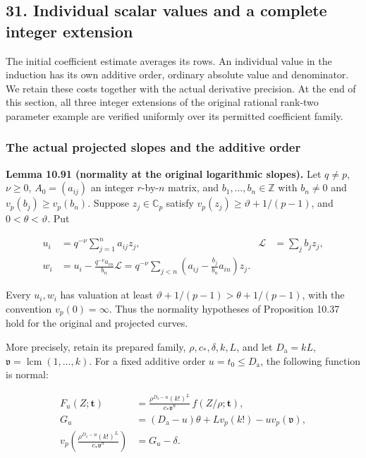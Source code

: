 \documentclass[
  11pt,
  a4paper,
]{article}
\begin{document}
\subsection{31. Individual scalar values and a complete integer
extension}\label{individual-scalar-values-and-a-complete-integer-extension}

The initial coefficient estimate averages its rows. An individual value
in the induction has its own additive order, ordinary absolute value and
denominator. We retain these costs together with the actual derivative
precision. At the end of this section, all three integer extensions of
the original rational rank-two parameter example are verified uniformly
over its permitted coefficient family.

\subsubsection{The actual projected slopes and the additive
order}\label{the-actual-projected-slopes-and-the-additive-order}

\textbf{Lemma 10.91 (normality at the original logarithmic slopes).} Let
\(q\ne p\), \(\nu\ge0\), \(A_0=(a_{ij})\) an integer \(r\)-by-\(n\)
matrix, and \(b_1,\ldots,b_n\in\mathbb Z\) with \(b_n\ne0\) and
\(v_p(b_j)\ge v_p(b_n)\). Suppose \(z_j\in\mathbb C_p\) satisfy
\(v_p(z_j)\ge\vartheta+1/(p-1)\), and \(0<\theta<\vartheta\). Put

\[
\begin{aligned}
u_i&=q^{-\nu}\sum_{j=1}^na_{ij}z_j,&
\mathcal L&=\sum_jb_jz_j,\\
w_i&=u_i-\frac{q^{-\nu}a_{in}}{b_n}\mathcal L
=q^{-\nu}\sum_{j<n}
\left(a_{ij}-\frac{b_j}{b_n}a_{in}\right)z_j.
\end{aligned}
\tag{10.237}
\]

Every \(u_i,w_i\) has valuation at least
\(\vartheta+1/(p-1)>\theta+1/(p-1)\), with the convention
\(v_p(0)=\infty\). Thus the normality hypotheses of Proposition 10.37
hold for the original and projected curves.

More precisely, retain its prepared family, \(\rho,c_*,\delta,k,L\), and
let \(D_{\mathrm a}=kL\),
\(\mathfrak v=\operatorname{lcm}(1,\ldots,k)\). For a fixed additive
order \(u=t_0\le D_{\mathrm a}\), the following function is normal:

\[
\begin{aligned}
F_u(Z;\boldsymbol t)
&=\frac{\rho^{D_{\mathrm a}-u}(k!)^L}
{c_*\mathfrak v^u}\,f(Z/\rho;\boldsymbol t),\\
G_u&=(D_{\mathrm a}-u)\theta+Lv_p(k!)
-u v_p(\mathfrak v),\\
v_p\!\left(\frac{\rho^{D_{\mathrm a}-u}(k!)^L}
{c_*\mathfrak v^u}\right)&=G_u-\delta .
\end{aligned}
\tag{10.238}
\]
\end{document}
